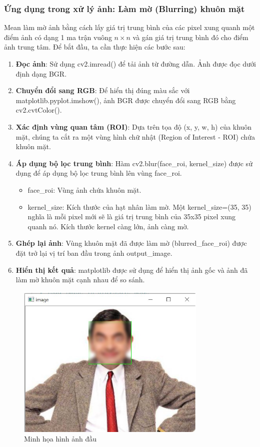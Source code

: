 \documentclass[11pt]{article}
\begin{document}
\subsubsection{Ứng dụng trong xử lý ảnh: Làm mờ (Blurring) khuôn mặt}
Mean làm mờ ảnh bằng cách lấy giá trị trung bình của các pixel xung quanh một điểm ảnh có dạng 1 ma trận vuông $n \times n$ và gán giá trị trung bình đó cho điểm ảnh trung tâm. Để bắt đầu, ta cần thực hiện các bước sau:
\begin{enumerate}
\item \textbf{Đọc ảnh}: Sử dụng cv2.imread() để tải ảnh từ đường dẫn. Ảnh được đọc dưới định dạng BGR.
\item \textbf{Chuyển đổi sang RGB}: Để hiển thị đúng màu sắc với matplotlib.pyplot.imshow(), ảnh BGR được chuyển đổi sang RGB bằng cv2.cvtColor().
\item \textbf{Xác định vùng quan tâm (ROI)}: Dựa trên tọa độ (x, y, w, h) của khuôn mặt, chúng ta cắt ra một vùng hình chữ nhật (Region of Interest - ROI) chứa khuôn mặt.
\item \textbf{Áp dụng bộ lọc trung bình}: Hàm cv2.blur(face\_roi, kernel\_size) được sử dụng để áp dụng bộ lọc trung bình lên vùng face\_roi.
\begin{itemize}
\item face\_roi: Vùng ảnh chứa khuôn mặt.
\item kernel\_size: Kích thước của hạt nhân làm mờ. Một kernel\_size=(35, 35) nghĩa là mỗi pixel mới sẽ là giá trị trung bình của 35x35 pixel xung quanh nó. Kích thước kernel càng lớn, ảnh càng mờ.
\end{itemize}
\item \textbf{Ghép lại ảnh}: Vùng khuôn mặt đã được làm mờ (blurred\_face\_roi) được đặt trở lại vị trí ban đầu trong ảnh output\_image.
\item \textbf{Hiển thị kết quả}: matplotlib được sử dụng để hiển thị ảnh gốc và ảnh đã làm mờ khuôn mặt cạnh nhau để so sánh.
\end{enumerate}


\begin{figure}[H]
    \centering
    \includegraphics[width=0.8\linewidth]{images/example_blur_face.png}
    \caption{Minh họa hình ảnh đầu }
\end{figure}
\end{document}
